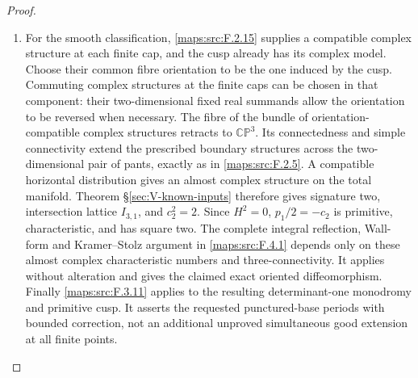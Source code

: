 \begin{proof}
\begin{enumerate}[label=\arabic*.]
\item For the smooth classification, \ref{maps:src:F.2.15} supplies a
compatible complex structure at each finite cap, and
the cusp already has its complex model.
Choose their common fibre orientation to be the one
induced by the cusp.
Commuting complex structures at the finite caps can
be chosen in that component: their two-dimensional
fixed real summands allow the orientation to be
reversed when necessary.
The fibre of the bundle of orientation-compatible
complex structures retracts to $\mathbb{CP}^3$.
Its connectedness and simple connectivity extend
the prescribed boundary structures across the
two-dimensional pair of pants, exactly as in \ref{maps:src:F.2.5}.
A compatible horizontal distribution gives an
almost complex structure on the total manifold.
Theorem \S\ref{sec:V-known-inputs} therefore gives signature two,
intersection lattice $I_{3,1}$, and $c_2^2=2$.
Since $H^2=0$, $p_1/2=-c_2$ is primitive,
characteristic, and has square two.
The complete integral reflection, Wall-form and Kramer--Stolz argument in \ref{maps:src:F.4.1}
depends only on these almost complex characteristic
numbers and three-connectivity.
It applies without alteration and gives the claimed
exact oriented diffeomorphism.
Finally \ref{maps:src:F.3.11} applies to the resulting determinant-one
monodromy and primitive cusp.
It asserts the requested punctured-base periods with
bounded correction, not an additional unproved
simultaneous good extension at all finite points.

\end{enumerate}
\end{proof}




